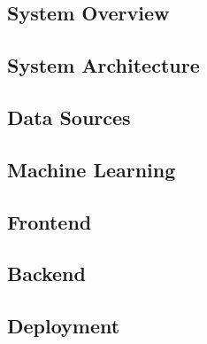 \subsection{System Overview}


\subsection{System Architecture}


\subsection{Data Sources}


\subsection{Machine Learning}


\subsection{Frontend}


\subsection{Backend}


\subsection{Deployment}
